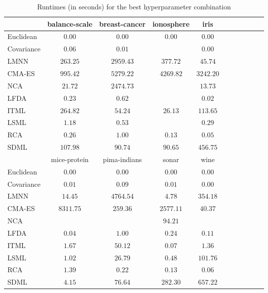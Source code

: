 \begin{table}[ht] \centering
\begin{tabular}{lcccccccccc}
\toprule


& \multicolumn{1}{c}{balance-scale} & \multicolumn{1}{c}{breast-cancer} & \multicolumn{1}{c}{ionosphere} & \multicolumn{1}{c}{iris} \\ 
\midrule
Euclidean & $\bm{0.00}$ & $\bm{0.00}$ & $\bm{0.00}$ & $\bm{0.00}$ \\
Covariance & $0.06$ & $0.01$ &  & $0.00$ \\
LMNN & $263.25$ & $2959.43$ & $377.72$ & $45.74$ \\
CMA-ES & $995.42$ & $5279.22$ & $4269.82$ & $3242.20$ \\
NCA & $21.72$ & $2474.73$ &  & $13.73$ \\
LFDA & $0.23$ & $0.62$ &  & $0.02$ \\
ITML & $264.82$ & $54.24$ & $26.13$ & $113.65$ \\
LSML & $1.18$ & $0.53$ &  & $0.29$ \\
RCA & $0.26$ & $1.00$ & $0.13$ & $0.05$ \\
SDML & $107.98$ & $90.74$ & $90.65$ & $456.75$ \\
\midrule
& \multicolumn{1}{c}{mice-protein} & \multicolumn{1}{c}{pima-indians} & \multicolumn{1}{c}{sonar} & \multicolumn{1}{c}{wine} \\ 
\midrule
Euclidean & $\bm{0.00}$ & $\bm{0.00}$ & $\bm{0.00}$ & $\bm{0.00}$ \\
Covariance & $0.01$ & $0.09$ & $0.01$ & $0.00$ \\
LMNN & $14.45$ & $4764.54$ & $4.78$ & $354.18$ \\
CMA-ES & $8311.75$ & $259.36$ & $2577.11$ & $40.37$ \\
NCA &  &  & $94.21$ &  \\
LFDA & $0.04$ & $1.00$ & $0.24$ & $0.11$ \\
ITML & $1.67$ & $50.12$ & $0.07$ & $1.36$ \\
LSML & $1.02$ & $26.79$ & $0.48$ & $101.76$ \\
RCA & $1.39$ & $0.22$ & $0.13$ & $0.06$ \\
SDML & $4.15$ & $76.64$ & $282.30$ & $657.22$ \\


\bottomrule
\end{tabular}
\caption{Runtimes (in seconds) for the best hyperparameter combination} \label{tab:runtimes}
\end{table}
